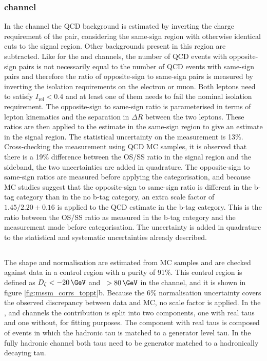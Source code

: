 \subsubsection{\texorpdfstring{\emu channel}{e mu channel}}
\label{sec:mssm_bkgs_qcd_em}
In the \emu channel the QCD background
is estimated by inverting the charge requirement
of the pair, considering the same-sign region
with otherwise identical cuts to the signal region.
Other backgrounds present in this region are subtracted.
Like for the \etau and \mutau channels, the number of
QCD events with opposite-sign \emu pairs is not
necessarily equal to the number of QCD events
with same-sign \emu pairs and therefore the ratio
of opposite-sign to same-sign pairs is measured by inverting
the isolation requirements on the electron or muon. Both
leptons need to satisfy $I_{\text{rel}} < 0.4$ and at 
least one of them needs to fail the nominal isolation requirement.
The opposite-sign to same-sign ratio is parameterised in terms
of lepton kinematics and the separation in $\Delta R$ between the
two leptons. These ratios are then applied to the estimate in the same-sign region
to give an estimate in the signal region. The statistical uncertainty
on the measurement is 13\%. Cross-checking the measurement 
using QCD \ac{MC} samples, it is observed that there is a 19\% difference
between the OS/SS ratio in the signal region and the sideband, the two
uncertainties are added in quadrature. 
The opposite-sign to same-sign ratios are measured
before applying the categorisation, and because \ac{MC} studies suggest
that the opposite-sign to same-sign ratio is different in the b-tag
category than in the no b-tag category, an extra scale factor of 
$1.45/2.20\pm0.16$ is applied to the QCD estimate in the b-tag category. This is 
the ratio between the OS/SS ratio as measured in the b-tag category and 
the measurement made before categorisation. The uncertainty is added in
quadrature to the statistical and systematic uncertainties already described.


\subsection{\texorpdfstring{\ttbar}{ttbar}}
\label{sec:mssm_bkgs_tt}
The \ttbar shape and normalisation are estimated from \ac{MC} 
samples and are checked against data in a control
region with a \ttbar purity of 91\%. This control region
is defined as $D_{\zeta} < -20\,\GeV$ and \MET~$>80\,\GeV$ in 
the \emu channel, and it is shown in figure \ref{fig:mssm_corrs_toppt}b.
Because the 6\%
\ttbar normalisation uncertainty covers the observed
discrepancy between data and \ac{MC}, no scale factor is applied.
In the \mutau, \etau and \tautau channels
the \ttbar contribution is split into
two components, one with real taus and 
one without, for fitting purposes. The component with real taus is composed
of \ttbar events in which the hadronic tau is matched
to a generator level tau. In the fully hadronic channel
both taus need to be generator matched to a hadronically
decaying tau.



